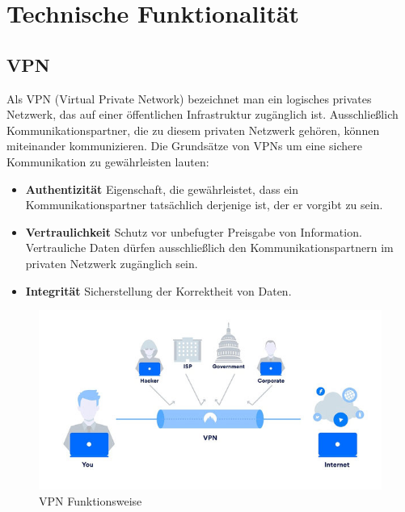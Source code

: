 \section{Technische Funktionalität} 
\subsection{VPN} \label{vpn}
Als VPN (Virtual Private Network) bezeichnet man ein logisches privates Netzwerk, das auf einer öffentlichen Infrastruktur zugänglich ist. Ausschließlich Kommunikationspartner, die zu diesem privaten Netzwerk gehören, können miteinander kommunizieren.\newline
Die Grundsätze von VPNs um eine sichere Kommunikation zu gewährleisten lauten:
\begin{itemize}
    \item \textbf{Authentizität} \newline
    Eigenschaft, die gewährleistet, dass ein Kommunikationspartner tatsächlich derjenige ist, der er vorgibt zu sein.
    \item \textbf{Vertraulichkeit} \newline
    Schutz vor unbefugter Preisgabe von Information. Vertrauliche Daten dürfen ausschließlich den Kommunikationspartnern im privaten Netzwerk zugänglich sein.
    \item \textbf{Integrität} \newline
    Sicherstellung der Korrektheit von Daten.
\end{itemize}
\begin{figure}[H]
  \centering
  \includegraphics[scale=0.85]{images/vpn.jpg}
  \caption{VPN Funktionsweise}
\end{figure}
